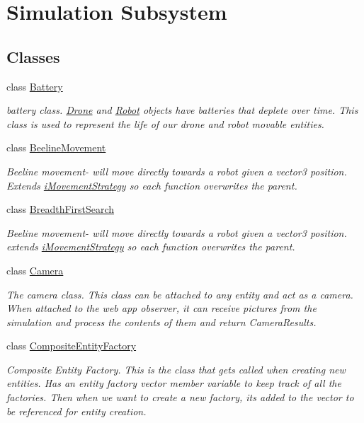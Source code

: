 \hypertarget{group__simulation}{}\section{Simulation Subsystem}
\label{group__simulation}
\subsection*{Classes}
\begin{DoxyCompactItemize}
\item 
class \hyperlink{classBattery}{Battery}
\begin{DoxyCompactList}\small\item\em battery class. \hyperlink{classDrone}{Drone} and \hyperlink{classRobot}{Robot} objects have batteries that deplete over time. This class is used to represent the life of our drone and robot movable entities. \end{DoxyCompactList}\item 
class \hyperlink{classBeelineMovement}{Beeline\+Movement}
\begin{DoxyCompactList}\small\item\em Beeline movement-\/ will move directly towards a robot given a vector3 position. Extends \hyperlink{classiMovementStrategy}{i\+Movement\+Strategy} so each function overwrites the parent. \end{DoxyCompactList}\item 
class \hyperlink{classBreadthFirstSearch}{Breadth\+First\+Search}
\begin{DoxyCompactList}\small\item\em Beeline movement-\/ will move directly towards a robot given a vector3 position. extends \hyperlink{classiMovementStrategy}{i\+Movement\+Strategy} so each function overwrites the parent. \end{DoxyCompactList}\item 
class \hyperlink{classCamera}{Camera}
\begin{DoxyCompactList}\small\item\em The camera class. This class can be attached to any entity and act as a camera. When attached to the web app observer, it can receive pictures from the simulation and process the contents of them and return Camera\+Results. \end{DoxyCompactList}\item 
class \hyperlink{classCompositeEntityFactory}{Composite\+Entity\+Factory}
\begin{DoxyCompactList}\small\item\em Composite Entity Factory. This is the class that get\textquotesingle{}s called when creating new entities. Has an entity factory vector member variable to keep track of all the factories. Then when we want to create a new factory, it\textquotesingle{}s added to the vector to be referenced for entity creation. \end{DoxyCompactList}\item 

\end{DoxyCompactItemize}
